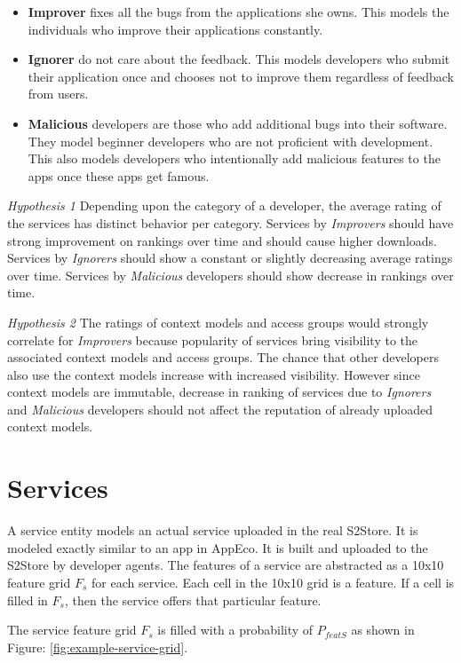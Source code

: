 \begin{itemize}
  \item \textbf{Improver} fixes all the bugs from the applications she owns. This models the individuals who improve their applications constantly.
  \item \textbf{Ignorer} do not care about the feedback. This models developers who submit their application once and chooses not to improve them regardless of feedback from users.
  \item \textbf{Malicious} developers are those who add additional bugs into their software. They model beginner developers who are not proficient with development. This also models developers who intentionally add malicious features to the apps once these apps get famous.
\end{itemize}

\emph{Hypothesis 1} Depending upon the category of a developer, the average rating of the services has distinct behavior per category. Services by \emph{Improvers} should have strong improvement on rankings over time and should cause higher downloads. Services by \emph{Ignorers} should show a constant or slightly decreasing average ratings over time. Services by \emph{Malicious} developers should show decrease in rankings over time.

\emph{Hypothesis 2} The ratings of context models and access groups would strongly correlate for \emph{Improvers} because popularity of services bring visibility to the associated context models and access groups. The chance that other developers also use the context models increase with increased visibility. However since context models are immutable, decrease in ranking of services due to \emph{Ignorers} and \emph{Malicious} developers should not affect the reputation of already uploaded context models.

\section{Services}

A service entity models an actual service uploaded in the real S2Store. It is modeled exactly similar to an app in AppEco. It is built and uploaded to the S2Store by developer agents. The features of a service are abstracted as a 10x10 feature grid $F_s$ for each service. Each cell in the 10x10 grid is a feature. If a cell is filled in $F_s$, then the service offers that particular feature.

The service feature grid $F_s$ is filled with a probability of $P_{featS}$ as shown in Figure: \ref{fig:example-service-grid}.


